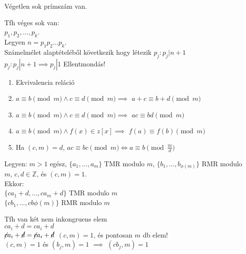 \begin{frame}

\begin{tcolorbox}[title={Tétel: Eukleidész tétele}]
Végetlen sok prímszám van.
\end{tcolorbox}

\begin{tcolorbox}[title={Bizonyítás (Indirekt)}]
Tfh véges sok van:\\
$p_1, p_2, ... ,p_k$.\\
Legyen $n = p_1p_2...p_k$.\\
Számelmélet alaptételéből következik hogy létezik $p_j : p_j | n + 1$\\
$p_j : p_j | n + 1 \implies p_j | 1$ Ellentmondás!
\end{tcolorbox}

\end{frame}

\begin{frame}

\begin{tcolorbox}[title={Tétel: Kongruencia tulajdonságai}]
\begin{enumerate}
\item Ekvivalencia reláció
\item $a \equiv b \pmod{m} \land c \equiv d \pmod{m} \implies$ \textbf{$a + c \equiv b + d \pmod{m}$}
\item $a \equiv b \pmod{m} \land c \equiv d \pmod{m} \implies$ \textbf{$ac \equiv bd \pmod{m}$}
\item $a \equiv b \pmod{m} \land f(x) \in z[x] \implies$ \textbf{$f(a) \equiv f(b) \pmod{m}$}
\item Ha $(c, m) = d$, $ac \equiv bc \pmod{m} \iff a \equiv b \pmod{\frac{m}{d}}$
\end{enumerate}
\end{tcolorbox}

\end{frame}

\begin{frame}

\begin{tcolorbox}[title={Tétel: Omnibusz tétel}]
Legyen: $m > 1$ egész, $\{a_1, ..., a_m\}$ TMR modulo $m$, $\{b_1, ..., b_{{\phi}(m)}\}$ RMR modulo $m$, $c, d \in \mathbb{Z}$, és $(c,m) = 1$.\\
\smallskip
Ekkor:\\
\smallskip
$\{ ca_1 + d, ..., ca_m + d \}$ TMR modulo $m$\\
$\{ cb_1, ..., cb{{\phi}(m)}\}$ RMR modulo $m$
\end{tcolorbox}

\begin{tcolorbox}[title={Bizonyítás (Indirekt)}]
Tfh van két nem inkongruens elem\\
$ca_i + d = ca_i + d$\\
${\cancel{c}}a_i + {\cancel{d}} = {\cancel{c}}a_i + {\cancel{d}}$ $(c, m) = 1$, és pontosan $m$ db elem!\\
$(c, m) = 1$ és $(b_j,m) = 1$ $\implies$ $(cb_j, m) = 1$

\end{tcolorbox}

\end{frame}

